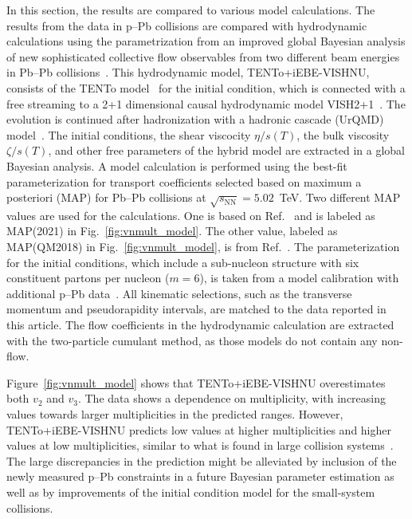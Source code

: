 In this section, the results are compared to various model calculations.
The results from the data in p--Pb collisions are compared with hydrodynamic calculations using the parametrization from an improved global
Bayesian analysis of new sophisticated collective flow observables
 from two different beam energies in Pb--Pb collisions~\cite{Parkkila:2021yha}. This hydrodynamic model, {TENTo}+iEBE-VISHNU, consists of the {TENTo} model~\cite{Moreland:2014oya} for the initial condition, which is connected with a free streaming to a 2+1 dimensional causal hydrodynamic model VISH2+1~\cite{Shen:2014vra}. The evolution is continued after hadronization with a hadronic cascade (UrQMD) model~\cite{Bass:1998ca,Bleicher:1999xi}. The initial conditions, the shear viscocity $\eta/s(T)$, the bulk viscosity $\zeta/s(T)$, and other free parameters of the hybrid model are extracted in a global Bayesian analysis.
A model calculation is performed using the best-fit parameterization for transport coefficients selected based on maximum a posteriori (MAP) for Pb--Pb collisions at $\sqrt{s_{\text{NN}}}=5.02$~TeV. Two different MAP values are used for the calculations. One is based on Ref.~\cite{Parkkila:2021yha} and is labeled as MAP(2021) in Fig.~\ref{fig:vnmult_model}. The other value, labeled as MAP(QM2018) in Fig.~\ref{fig:vnmult_model}, is from Ref.~\cite{Bernhard:2016tnd}. The parameterization for the initial conditions, which include a sub-nucleon structure with six constituent partons per nucleon ($m=6$), is taken from a model calibration with additional p--Pb data~\cite{Moreland:2018gsh}. All kinematic selections, such as the transverse momentum and pseudorapidity intervals, are matched to the data reported in this article. The flow coefficients in the hydrodynamic calculation are extracted with the two-particle cumulant method, as those models do not contain any non-flow.

Figure~\ref{fig:vnmult_model} shows that {TENTo}+iEBE-VISHNU overestimates both $v_2$ and $v_3$. The data shows a dependence on multiplicity, with increasing values towards larger multiplicities in the predicted ranges. However, {TENTo}+iEBE-VISHNU predicts low values at higher multiplicities and higher values at low multiplicities, similar to what is found in large collision systems~\cite{Acharya:2020taj}. The large discrepancies in the prediction might be alleviated by inclusion of the newly measured p--Pb constraints in a future Bayesian parameter estimation as well as by improvements of the initial condition model for the small-system collisions.

